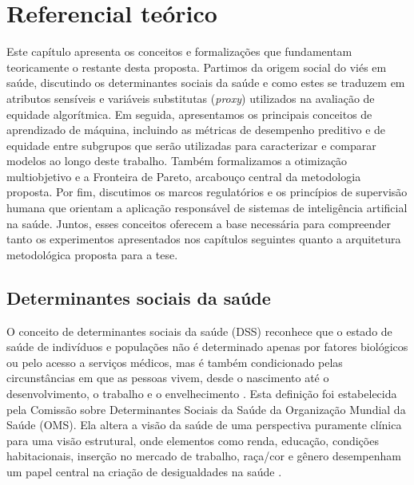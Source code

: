 \chapter{Referencial teórico}

Este capítulo apresenta os conceitos e formalizações que fundamentam teoricamente o restante desta proposta. Partimos da origem social do viés em saúde, discutindo os determinantes sociais da saúde e como estes se traduzem em atributos sensíveis e variáveis substitutas (\textit{proxy}) utilizados na avaliação de equidade algorítmica. Em seguida, apresentamos os principais conceitos de aprendizado de máquina, incluindo as métricas de desempenho preditivo e de equidade entre subgrupos que serão utilizadas para caracterizar e comparar modelos ao longo deste trabalho. Também formalizamos a otimização multiobjetivo e a Fronteira de Pareto, arcabouço central da metodologia proposta. Por fim, discutimos os marcos regulatórios e os princípios de supervisão humana que orientam a aplicação responsável de sistemas de inteligência artificial na saúde. Juntos, esses conceitos oferecem a base necessária para compreender tanto os experimentos apresentados nos capítulos seguintes quanto a arquitetura metodológica proposta para a tese.


\section{Determinantes sociais da saúde}\label{sec:sdoh}

O conceito de determinantes sociais da saúde (DSS) reconhece que o estado de saúde de indivíduos e populações não é determinado apenas por fatores biológicos ou pelo acesso a serviços médicos, mas é também condicionado pelas circunstâncias em que as pessoas vivem, desde o nascimento até o desenvolvimento, o trabalho e o envelhecimento \cite{who2008closing}. Esta definição foi estabelecida pela Comissão sobre Determinantes Sociais da Saúde da Organização Mundial da Saúde (OMS). Ela altera a visão da saúde de uma perspectiva puramente clínica para uma visão estrutural, onde elementos como renda, educação, condições habitacionais, inserção no mercado de trabalho, raça/cor e gênero desempenham um papel central na criação de desigualdades na saúde \cite{marmot2005social}.

